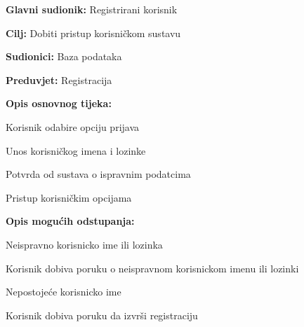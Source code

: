 					
						\noindent {}
					\begin{packed_item}
						
						\item \textbf{Glavni sudionik: }Registrirani korisnik
						\item  \textbf{Cilj:} Dobiti pristup korisničkom sustavu
						\item  \textbf{Sudionici:} Baza podataka
						\item  \textbf{Preduvjet:} Registracija
						\item  \textbf{Opis osnovnog tijeka:}
						
						\item[] \begin{packed_enum}
							
							\item Korisnik odabire opciju prijava
							\item Unos korisničkog imena i lozinke
							\item Potvrda od sustava o ispravnim podatcima
							\item Pristup korisničkim opcijama
						\end{packed_enum}
						
						\item  \textbf{Opis mogućih odstupanja:}
						
						\item[] \begin{packed_item}
							
							\item[3.a] Neispravno korisnicko ime ili lozinka
							\item[] \begin{packed_enum}
								
								\item Korisnik dobiva poruku o neispravnom korisnickom imenu ili lozinki
							\end{packed_enum}
							
							\item[3.b] Nepostojeće korisnicko ime
							\item[] \begin{packed_enum}
								
								\item Korisnik dobiva poruku da izvrši registraciju
							\end{packed_enum}
							
							
						\end{packed_item}
					\end{packed_item}
					
